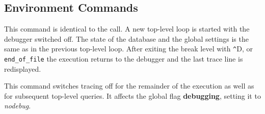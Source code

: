 \subsection{Environment Commands}
\begin{descr}{1cm}

This command is identical to the
 call.
A new top-level loop is started with the debugger switched off.
The state of the database and the global settings is the same as
in the previous top-level loop.
After exiting the break level with \verb'^'D, or {\tt end_of_file}
the execution returns to the debugger and the last trace line is redisplayed.

This command switches tracing off for the remainder of the execution
as well as for subsequent top-level queries. It affects the global
flag {\bf debugging}, setting it to {\it nodebug}.

%

\end{descr}

